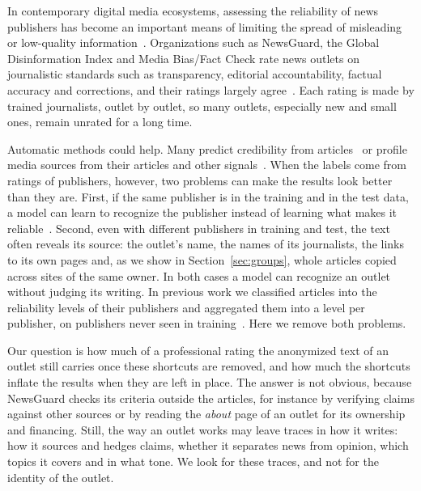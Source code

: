 \documentclass[11pt,a4paper]{article}
\begin{document}
In contemporary digital media ecosystems, assessing the reliability of news publishers has become an important means
of limiting the spread of misleading or low-quality information~\cite{Bowman2003,Jemielniak2020}. Organizations such as
NewsGuard, the Global Disinformation Index and Media Bias/Fact Check rate news outlets on journalistic standards such as
transparency, editorial accountability, factual accuracy and corrections, and their ratings largely
agree~\cite{lin2023high,DBLP:conf/icwsm/PratelliP22}. Each rating is made by trained journalists, outlet by outlet, so
many outlets, especially new and small ones, remain unrated for a long time.

Automatic methods could help. Many predict credibility from articles~\cite{pandolfi2020automatic,Przybyla2021plugin,
10.1145/3770077,DBLP:journals/dbsk/AdjiLS26} or profile media sources from their articles and other
signals~\cite{baly2018predicting,baly2020written,nakov2024survey}. When the labels come from ratings of publishers,
however, two problems can make the results look better than they are. First, if the same publisher is in the training
and in the test data, a model can learn to recognize the publisher instead of learning what makes it
reliable~\cite{zhou2021hidden,azizov-etal-2024-safari,verhoeven2025yesterday}. Second, even with different publishers
in training and test, the text often reveals its source: the outlet's name, the names of its journalists, the links to
its own pages and, as we show in Section~\ref{sec:groups}, whole articles copied across sites of the same owner. In both
cases a model can recognize an outlet without judging its writing. In previous work we classified articles into the reliability levels of their publishers and aggregated them into a
level per publisher, on publishers never seen in training~\cite{Bianchi2024SAC,bianchi2026articles}. Here we remove both problems.

Our question is how much of a professional rating the anonymized text of an outlet still carries once these
shortcuts are removed, and how much the shortcuts inflate the results when they are left in place. The answer is not
obvious, because NewsGuard checks its criteria outside the articles, for instance by verifying claims against other
sources or by reading the \emph{about} page of an outlet for its ownership and financing. Still, the way an outlet works
may leave traces in how it writes: how it sources and hedges claims, whether it separates news from opinion, which
topics it covers and in what tone. We look for these traces, and not for the identity of the outlet.
\end{document}
